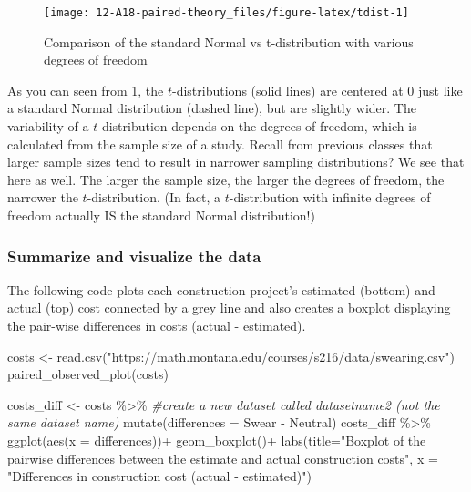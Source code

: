 \documentclass[
]{report}
\newenvironment{Shaded}{\begin{snugshade}}{\end{snugshade}}
\newcommand{\AttributeTok}[1]{\textcolor[rgb]{0.77,0.63,0.00}{#1}}
\newcommand{\CommentTok}[1]{\textcolor[rgb]{0.56,0.35,0.01}{\textit{#1}}}
\newcommand{\FunctionTok}[1]{\textcolor[rgb]{0.00,0.00,0.00}{#1}}
\newcommand{\NormalTok}[1]{#1}
\newcommand{\OtherTok}[1]{\textcolor[rgb]{0.56,0.35,0.01}{#1}}
\newcommand{\SpecialCharTok}[1]{\textcolor[rgb]{0.00,0.00,0.00}{#1}}
\newcommand{\StringTok}[1]{\textcolor[rgb]{0.31,0.60,0.02}{#1}}
\begin{document}
\begin{figure}

{\centering \texttt{[image: 12-A18-paired-theory\_files/figure-latex/tdist-1]} 

}

\caption{Comparison of the standard Normal vs t-distribution with various degrees of freedom}\label{fig:tdist}
\end{figure}

As you can seen from \ref{fig:tdist}, the \(t\)-distributions (solid lines) are centered at 0 just like a standard Normal distribution (dashed line), but are slightly wider. The variability of a \(t\)-distribution depends on the degrees of freedom, which is calculated from the sample size of a study. Recall from previous classes that larger sample sizes tend to result in narrower sampling distributions? We see that here as well. The larger the sample size, the larger the degrees of freedom, the narrower the \(t\)-distribution. (In fact, a \(t\)-distribution with infinite degrees of freedom actually IS the standard Normal distribution!)

\hypertarget{summarize-and-visualize-the-data-3}{%
\subsubsection*{Summarize and visualize the data}\label{summarize-and-visualize-the-data-3}}

The following code plots each construction project's estimated (bottom) and actual (top) cost connected by a grey line and also creates a boxplot displaying the pair-wise differences in costs (actual - estimated).

\begin{Shaded}
\begin{Highlighting}[]
\NormalTok{costs }\OtherTok{\textless{}{-}} \FunctionTok{read.csv}\NormalTok{(}\StringTok{"https://math.montana.edu/courses/s216/data/swearing.csv"}\NormalTok{)}
\FunctionTok{paired\_observed\_plot}\NormalTok{(costs)}

\NormalTok{costs\_diff }\OtherTok{\textless{}{-}}\NormalTok{ costs }\SpecialCharTok{\%\textgreater{}\%} \CommentTok{\#create a new dataset called datasetname2 (not the same dataset name)}
  \FunctionTok{mutate}\NormalTok{(}\AttributeTok{differences =}\NormalTok{ Swear }\SpecialCharTok{{-}}\NormalTok{ Neutral)}
\NormalTok{costs\_diff }\SpecialCharTok{\%\textgreater{}\%}
  \FunctionTok{ggplot}\NormalTok{(}\FunctionTok{aes}\NormalTok{(}\AttributeTok{x =}\NormalTok{ differences))}\SpecialCharTok{+}
  \FunctionTok{geom\_boxplot}\NormalTok{()}\SpecialCharTok{+}
  \FunctionTok{labs}\NormalTok{(}\AttributeTok{title=}\StringTok{"Boxplot of the pairwise differences between the estimate and actual construction costs"}\NormalTok{,}
       \AttributeTok{x =} \StringTok{"Differences in construction cost (actual {-} estimated)"}\NormalTok{)}
\end{Highlighting}
\end{Shaded}
\end{document}

